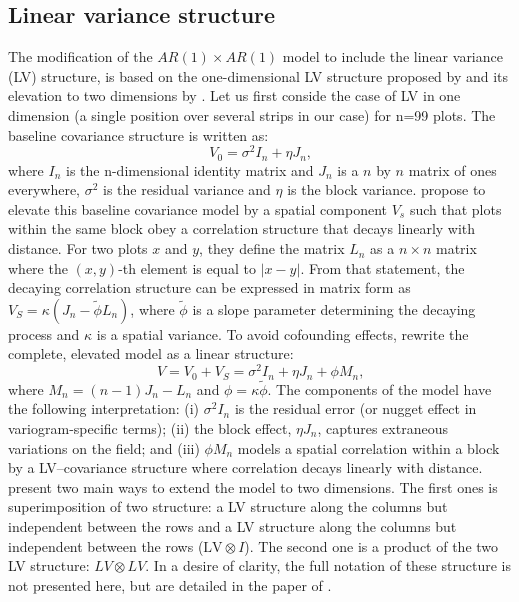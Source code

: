\subsection{Linear variance structure}
The modification of the $AR(1) \times AR(1)$ model to include the linear variance (LV) structure, is based on the one-dimensional LV structure proposed by \textcite{williams_neighbour_1986} and its elevation to two dimensions by \textcite{piepho_linear_2010}.
Let us first conside the case of LV in one dimension (a single position over several strips in our case) for n=99 plots. The baseline covariance structure is written as:
\begin{equation}
	V_{0}=\sigma^{2} I_{n}+\eta J_{n}
	\text{,}
\end{equation}
where $I_{n}$ is the n-dimensional identity matrix and $J_{n}$ is a $n$ by $n$ matrix of ones everywhere, $\sigma^2$ is the residual variance and $\eta$ is the block variance. 
\textcite{williams_neighbour_1986} propose to elevate this baseline covariance model by a spatial component $V_{s}$ such that plots within the same block obey a correlation structure that decays linearly with distance. 
For two plots $x$ and $y$, they define the matrix $L_n$ as a $n\times n$ matrix where the $(x,y)$-th element is equal to $|x-y|$. 
From that statement, the decaying correlation structure can be expressed in matrix form as $V_{S}=\kappa\left(J_{n}-\tilde{\phi} L_{n}\right)$, where $\tilde{\phi}$ is a slope parameter determining the decaying process and $\kappa$ is a spatial variance. 
To avoid cofounding effects, \textcite{williams_neighbour_1986} rewrite the complete, elevated model as a linear structure:
\begin{equation}
	V=V_{0}+V_{S}=\sigma^{2} I_{n}+\eta J_{n}+\phi M_{n}
	\text{,}
\end{equation}
where $M_n = (n-1)J_n - L_n$ and $\phi = \kappa\tilde{\phi}$. The components of the model have the following interpretation: (i) $\sigma^{2} I_{n}$ is the residual error (or nugget effect in variogram-specific terms); (ii) the block effect, $\eta J_n$, captures extraneous variations on the field; and (iii) $\phi M_n$ models a spatial correlation within a block by a LV–covariance structure where correlation decays linearly with distance.\\

\textcite{piepho_linear_2010} present two main ways to extend the model to two dimensions. The first ones is superimposition of two structure: a LV structure along the columns but independent between the rows  and a LV structure along the columns but independent between the rows ($\mathrm{LV} \otimes I$). The second one is a product of the two LV structure: $LV \otimes LV$. In a desire of clarity, the full notation of these structure is not presented here, but are detailed in the paper of \textcite{piepho_linear_2010}.\\

